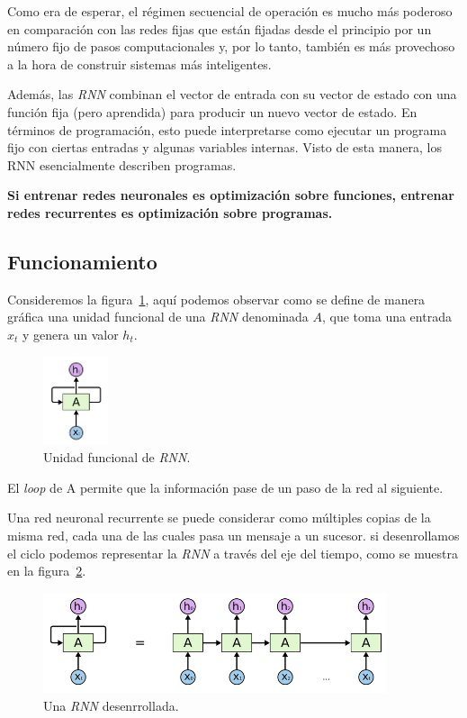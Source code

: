 \documentclass[a4paper,12pt]{article}
\begin{document}
Como era de esperar, el régimen secuencial de operación es mucho más poderoso en comparación con las redes fijas que están fijadas desde el principio por un número fijo de pasos computacionales y, por lo tanto, también es más provechoso a la hora de construir sistemas más inteligentes. 

Además, las \textit{RNN} combinan el vector de entrada con su vector de estado con una función fija (pero aprendida) para producir un nuevo vector de estado. En términos de programación, esto puede interpretarse como ejecutar un programa fijo con ciertas entradas y algunas variables internas. Visto de esta manera, los RNN esencialmente describen programas.

\textbf{Si entrenar redes neuronales es optimización sobre funciones, entrenar redes recurrentes es optimización sobre programas.}

\subsection{Funcionamiento}

Consideremos la figura~\ref{fig:rnnunit}, aquí podemos observar como se define de manera gráfica una unidad funcional de una \textit{RNN} denominada $A$, que toma una entrada $x_t$ y genera un valor $h_t$.

\begin{figure}[H]
	\begin{center}				
		\includegraphics[width=0.17\textwidth]{tesis_27.png}
		\caption{Unidad funcional de \textit{RNN}. \citep{olahlstm}}
		\label{fig:rnnunit}
	\end{center}
\end{figure}

El \textit{loop} de A permite que la información pase de un paso de la red al siguiente.

Una red neuronal recurrente se puede considerar como múltiples copias de la misma red, cada una de las cuales pasa un mensaje a un sucesor. si desenrollamos el ciclo podemos representar la \textit{RNN} a través del eje del tiempo, como se muestra en la  figura~\ref{fig:rnnunrolled}.

\begin{figure}[H]
	\begin{center}
		\includegraphics[width=0.9\textwidth]{tesis_28.png}
		\caption{Una \textit{RNN} desenrrollada. \citep{olahlstm}}
		\label{fig:rnnunrolled}
	\end{center}
\end{figure}
\end{document}
